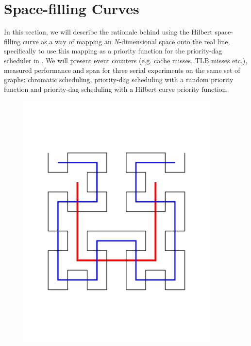 \section{Space-filling Curves}
\label{sec:hilbert}

In this section, we will describe the rationale behind using the
Hilbert space-filling curve as a way of mapping an $N$-dimensional
space onto the real line, specifically to use this mapping as a
priority function for the priority-dag scheduler in .
We will present event counters (e.g. cache misses, TLB misses etc.), 
measured performance and span for three serial experiments on the same
set of graphs: chromatic scheduling, priority-dag scheduling with
a random priority function and priority-dag scheduling with a
Hilbert curve priority function.  

\begin{figure}[h]
\centering
\includegraphics[width=4in]{2d_hilbert.pdf}
\caption{}
\label{fig:2d_hilbert}
\end{figure}